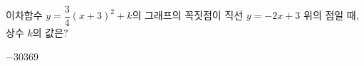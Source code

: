 이차함수 $y=\dfrac{3}{4}(x+3)^2+k$의 그래프의 꼭짓점이 직선 $y=-2x+3$ 위의 점일 때, 상수 $k$의 값은?
\begin{choices32}{$-3$}{$0$}{$3$}{$6$}{$9$}\end{choices32}
